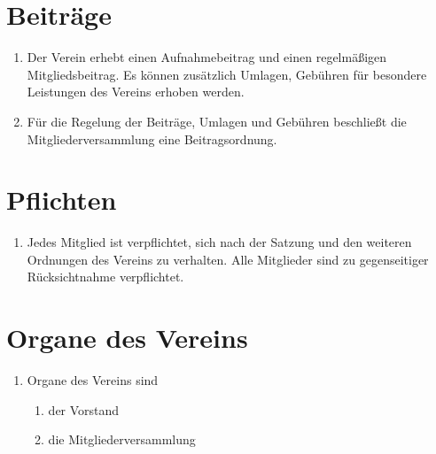 \documentclass[a4paper,ngerman]{scrartcl}
\begin{document}
\section{Beiträge}
\begin{enumerate}
\item Der Verein erhebt einen Aufnahmebeitrag und einen regelmäßigen Mitgliedsbeitrag. Es können zusätzlich Umlagen, Gebühren für besondere Leistungen des Vereins erhoben werden.
\item Für die Regelung der Beiträge, Umlagen und Gebühren beschließt die Mitgliederversammlung eine Beitragsordnung.
\end{enumerate}

\section{Pflichten}
\begin{enumerate}
\item Jedes Mitglied ist verpflichtet, sich nach der Satzung und den weiteren Ordnungen des Vereins zu verhalten. Alle Mitglieder sind zu gegenseitiger Rücksichtnahme verpflichtet.
\end{enumerate}

\section{Organe des Vereins}
\begin{enumerate}
\item Organe des Vereins sind
\begin{enumerate}
\item der Vorstand
\item die Mitgliederversammlung
\end{enumerate}
\end{enumerate}

\end{document}
